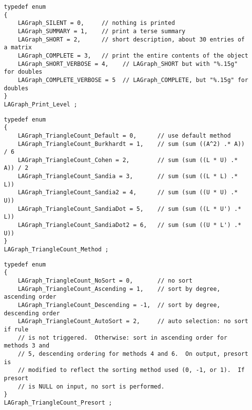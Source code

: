 \begin{verbatim}
typedef enum
{
    LAGraph_SILENT = 0,     // nothing is printed
    LAGraph_SUMMARY = 1,    // print a terse summary
    LAGraph_SHORT = 2,      // short description, about 30 entries of a matrix
    LAGraph_COMPLETE = 3,   // print the entire contents of the object
    LAGraph_SHORT_VERBOSE = 4,    // LAGraph_SHORT but with "%.15g" for doubles
    LAGraph_COMPLETE_VERBOSE = 5  // LAGraph_COMPLETE, but "%.15g" for doubles
}
LAGraph_Print_Level ;
\end{verbatim}




\begin{verbatim}
typedef enum
{
    LAGraph_TriangleCount_Default = 0,      // use default method
    LAGraph_TriangleCount_Burkhardt = 1,    // sum (sum ((A^2) .* A)) / 6
    LAGraph_TriangleCount_Cohen = 2,        // sum (sum ((L * U) .* A)) / 2
    LAGraph_TriangleCount_Sandia = 3,       // sum (sum ((L * L) .* L))
    LAGraph_TriangleCount_Sandia2 = 4,      // sum (sum ((U * U) .* U))
    LAGraph_TriangleCount_SandiaDot = 5,    // sum (sum ((L * U') .* L))
    LAGraph_TriangleCount_SandiaDot2 = 6,   // sum (sum ((U * L') .* U))
}
LAGraph_TriangleCount_Method ;
\end{verbatim}




\begin{verbatim}
typedef enum
{
    LAGraph_TriangleCount_NoSort = 0,       // no sort
    LAGraph_TriangleCount_Ascending = 1,    // sort by degree, ascending order
    LAGraph_TriangleCount_Descending = -1,  // sort by degree, descending order
    LAGraph_TriangleCount_AutoSort = 2,     // auto selection: no sort if rule
    // is not triggered.  Otherwise: sort in ascending order for methods 3 and
    // 5, descending ordering for methods 4 and 6.  On output, presort is
    // modified to reflect the sorting method used (0, -1, or 1).  If presort
    // is NULL on input, no sort is performed.
}
LAGraph_TriangleCount_Presort ;
\end{verbatim}




